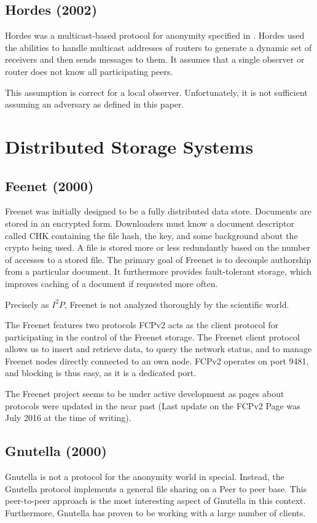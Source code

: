 \subsection{Hordes (2002)}
Hordes was a multicast-based protocol for anonymity specified in \cite{Levine:2002}. Hordes used the abilities to handle multicast addresses of routers to generate a dynamic set of receivers and then sends messages to them. It assumes that a single observer or router does not know all participating peers. 


This assumption is correct for a local observer. Unfortunately, it is not sufficient assuming an adversary as defined in this paper.

\section{Distributed Storage Systems}
\subsection{Feenet (2000)}
Freenet was initially designed to be a fully distributed data store\cite{freenet}. Documents are stored in an encrypted form. Downloaders must know a document descriptor called CHK containing the file hash, the key, and some background about the crypto being used. A file is stored more or less redundantly based on the number of accesses to a stored file. The primary goal of Freenet is to decouple authorship from a particular document. It furthermore provides fault-tolerant storage, which improves caching of a document if requested more often.

Precisely as $I^2P$, Freenet is not analyzed thoroughly by the scientific world. 

The Freenet features two protocols FCPv2 acts as the client protocol for participating in the control of the Freenet storage. The Freenet client protocol allows us to insert and retrieve data, to query the network status, and to manage Freenet nodes directly connected to an own node. FCPv2 operates on port 9481, and blocking is thus easy, as it is a dedicated port. 

The Freenet project seems to be under active development as pages about protocols were updated in the near past (Last update on the FCPv2 Page was July  2016 at the time of writing).

\subsection{Gnutella (2000)}
Gnutella is not a protocol for the anonymity world in special. Instead, the Gnutella protocol implements a general file sharing on a Peer to peer base. This peer-to-peer approach is the most interesting aspect of Gnutella in this context. Furthermore, Gnutella has proven to be working with a large number of clients.

